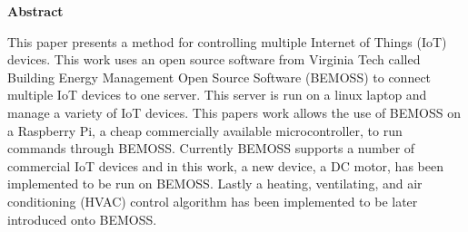 
\begin{center}\textbf{Abstract}\end{center}

This paper presents a method for controlling multiple Internet of Things (IoT) devices. This work uses an open source software from Virginia Tech called Building Energy Management Open Source Software (BEMOSS) to connect multiple IoT devices to one server. This server is run on a linux laptop and manage a variety of IoT devices. This papers work allows the use of BEMOSS on a Raspberry Pi, a cheap commercially available microcontroller, to run commands through BEMOSS. Currently BEMOSS supports a number of commercial IoT devices and in this work, a new device, a DC motor, has been implemented to be run on BEMOSS. Lastly a heating, ventilating, and air conditioning (HVAC) control algorithm has been implemented to be later introduced onto BEMOSS. 
\cleardoublepage


